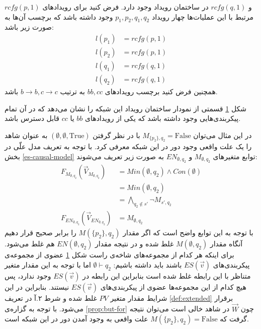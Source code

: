 \documentclass[
msc,
irfonts
]{./tex/tehran-thesis}
\newcommand{\پ}{پروژه/پایان‌نامه/رساله }
\theoremstyle{definition}
\theoremstyle{theorem}
\theoremstyle{definition}
\numberwithin{algorithm}{chapter}
\newcommand{\F}{\mathrm{False}}
\newcommand{\T}{\mathrm{True}}
\newcommand{\s}[1]{\{#1\}}
\newcommand{\e}{\emptyset}
\newcommand{\ra}{\rightarrow}
\newcommand{\crd}[4][above]{
    \node[draw,circle,inner sep=2pt,fill,label={[#1]:#4}] at (#2,#3) {};
}
\newcommand{\f}[1]{F_{#1}(\vec V_{#1})}
\begin{document}
$rcfg(p,1)$
و
$rcfg(q,1)$
در ساختمان رویداد وجود دارد.
فرض کنید برای رویداد‌های مرتبط با این عملیات‌ها چهار رویداد
$p_1,p_2,q_1,q_2$
وجود داشته باشد که برچسب آن‌ها به صورت زیر باشد:
\begin{align*}
    l(p_1) & = rcfg(p,1) \\
    l(p_2) & = rcfg(p,1) \\
    l(q_1) & = rcfg(q,1) \\
    l(q_2) & = rcfg(q,1)
\end{align*}
همچنین فرض کنید برچسب رویداد‌های
$bb,cc$
به ترتیب
$b\ra b,c\ra c$
باشد.
\begin{figure}
    \centering
    \caption{}
    \label{fig:loop:es}
\end{figure}
شکل
\ref{fig:loop:es}
قسمتی از نمودار ساختمان رویداد این شبکه را نشان می‌دهد که در آن تمام پیکر‌بندی‌هایی وجود داشته باشد که یکی از رویداد‌های
$bb$
یا
$cc$
قابل دسترس باشد.

در این مثال می‌توان
$M_{\s{p_2},q_2}= \F$
با در نظر گرفتن
$(\e,\e,\T)$
به عنوان شاهد را یک علت واقعی وجود دور در این شبکه
معرفی کرد.
با توجه به تعریف مدل علّی در بخش
\ref{es-causal-model}
توابع متغیر‌های
$M_{\e,q_2}$
و
$EN_{\e,q_2}$
به صورت زیر تعریف می‌شوند:
\begin{align*}
    \f{M_{\e,q_2}}  & = Min(\e,q_2) \wedge Con(\e) \\
                    & = Min(\e,q_2)                \\
                    & =  \bigwedge_{q_2 \notin s'}
    \neg M_{s',q_2}                                \\
    \f{EN_{\e,q_2}} & = M_{\e,q_2}
\end{align*}
با توجه به این توابع واضح است که 
اگر مقدار
$M(\s{p_2},q_2)$
را برابر صحیح قرار دهیم آنگاه مقدار
$M(\e,q_2)$
غلط شده و در نتیجه مقدار
$EN(\e,q_2)$
هم غلط می‌شود.
برای اینکه هر کدام از مجموعه‌های شاخه‌ی راست شکل
\ref{fig:loop:es}
عضوی از مجموعه‌ی پیکربندی‌های 
$ES(\vec v)$
باشند باید داشته باشیم:
$\e \vdash q_2$
اما با توجه به این مقدار متغیر متناظر با این رابطه غلط شده است بنابراین این رابطه در 
$ES(\vec v)$
وجود ندارد، پس هیچ کدام از این مجموعه‌ها عضوی از پیکربندی‌های 
$ES(\vec v)$
نیستند.
بنابراین در این شرایط مقدار متغیر 
$PV$
غلط شده و شرط ۲.آ در تعریف 
\ref{def:extended}
برقرار می‌شود.
با توجه به گزاره‌ی 
\ref{prop:but-for}
چون
$\vec W$
در شاهد خالی است می‌توان نتیجه گرفت که
$M(\s{p_2},q_2) = \F$
علت واقعی به وجود آمدن دور در این شبکه است.
 
\end{document}
